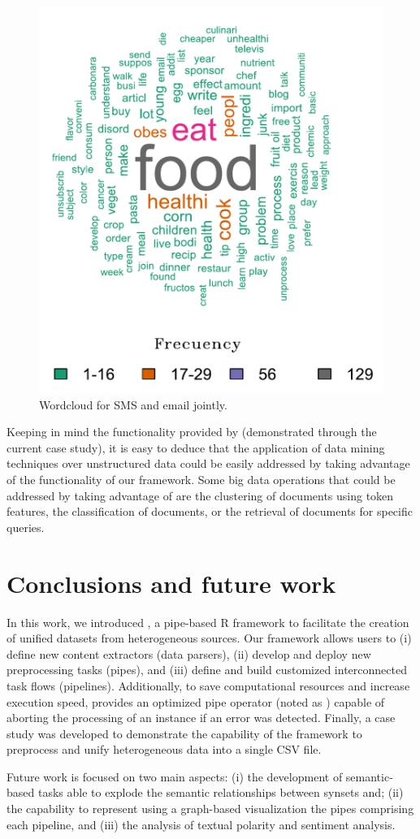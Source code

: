 \begin{figure}[H]
  \centering
  \includegraphics[width=.5\textwidth, height=.5\textwidth, keepaspectratio]{Figures/Figure3.pdf}
    \caption{Wordcloud for SMS and email jointly.}
  \label{Figure3}
\end{figure}

Keeping in mind the functionality provided by  (demonstrated through the current case study), it is easy to deduce that the application of data mining techniques over unstructured data could be easily addressed by taking advantage of the functionality of our framework. Some big data operations that could be addressed by taking advantage of  are the clustering of documents using token features, the classification of documents, or the retrieval of documents for specific queries.

\section{Conclusions and future work}
In this work, we introduced , a pipe-based R framework to facilitate the creation of unified datasets from heterogeneous sources. Our framework allows users to (i) define new content extractors (data parsers), (ii) develop and deploy new preprocessing tasks (pipes), and (iii) define and build customized interconnected task flows (pipelines). Additionally, to save computational resources and increase execution speed,  provides an optimized pipe operator (noted as ) capable of aborting the processing of an instance if an error was detected. Finally, a case study was developed to demonstrate the capability of the framework to preprocess and unify heterogeneous data into a single CSV file. 

Future work is focused on two main aspects: (i) the development of semantic-based tasks able to explode the semantic relationships between synsets and; (ii) the capability to represent using a graph-based visualization the pipes comprising each pipeline, and (iii) the analysis of textual polarity and sentiment analysis.

